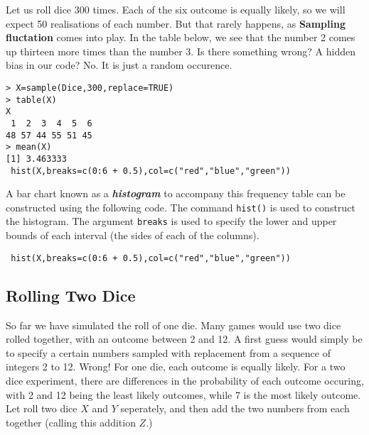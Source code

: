 \documentclass[11pt]{article} %
\begin{document}
Let us roll dice 300 times.  Each of the six outcome is equally likely,  so we will expect 50 realisations of each number.  But that rarely happens, as \textbf{Sampling fluctation} comes into play.
In the table below, we see that the number 2 comes up thirteen more times than the number 3. Is there something wrong? A hidden bias in our code? No. It is just a random occurence.

\begin{verbatim}
> X=sample(Dice,300,replace=TRUE)
> table(X)
X
 1  2  3  4  5  6 
48 57 44 55 51 45 
> mean(X)
[1] 3.463333
 hist(X,breaks=c(0:6 + 0.5),col=c("red","blue","green"))
\end{verbatim}
 
A bar chart known as a \textbf{\textit{histogram}} to accompany this frequency table can be constructed using the following code. The command \texttt{hist()} is used to construct the histogram. The argument \texttt{breaks} is used to specify the lower and upper bounds of each interval (the sides of each of the columns).
\begin{framed}
\begin{verbatim}
 hist(X,breaks=c(0:6 + 0.5),col=c("red","blue","green"))

\end{verbatim}
\end{framed}
\subsection{Rolling Two Dice}
So far we have simulated the roll of one die. Many games would use two dice rolled together, with an outcome between 2 and 12. A first guess would simply be to specify a certain numbers sampled with replacement from a sequence of integers 2 to 12. Wrong! 
For one die, each outcome is equally likely. For a two dice experiment, there are differences in the probability of each outcome occuring, with 2 and 12  being the least likely outcomes, while 7 is the most likely outcome.
Let roll two dice $X$ and $Y$ seperately, and then add the two numbers from each together (calling this addition $Z$.)
\end{document}
